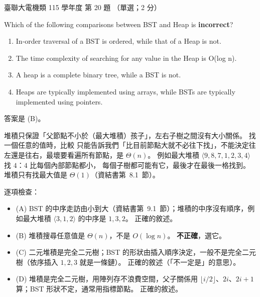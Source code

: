 \begin{pastexam}[label={px:ust-115-ee-ds-20}]{臺聯大電機類 115 學年度 第 20 題}
（單選；2 分）

Which of the following comparisons between BST and Heap is \textbf{incorrect}?
\begin{enumerate}[label=(\Alph*)]
\item In-order traversal of a BST is ordered, while that of a Heap is not.
\item The time complexity of searching for any value in the Heap is O(log n).
\item A heap is a complete binary tree, while a BST is not.
\item Heaps are typically implemented using arrays, while BSTs are typically implemented using
pointers.
\end{enumerate}
\end{pastexam}

\begin{pastsoln}
答案是 (B)。

堆積只保證「父節點不小於（最大堆積）孩子」，左右子樹之間沒有大小關係。 找一個任意的值時，比較
只能告訴我們「比目前節點大就不必往下找」，不能決定往左還是往右，最壞要看遍所有節點，是
$\Theta(n)$。 例如最大堆積 $\langle 9, 8, 7, 1, 2, 3, 4\rangle$ 找 $4$：$4$ 比每個內部節點都小，
每個子樹都可能有它，最後才在最後一格找到。 堆積只有找最大值是 $\Theta(1)$（資結書第~8.1~節）。

逐項檢查：
\begin{itemize}
\item (A) BST 的中序走訪由小到大（資結書第~9.1~節）；堆積的中序沒有順序，例如最大堆積
$\langle 3, 1, 2\rangle$ 的中序是 $1, 3, 2$。 正確的敘述。
\item (B) 堆積搜尋任意值是 $\Theta(n)$，不是 $O(\log n)$。 \textbf{不正確}，選它。
\item (C) 二元堆積是完全二元樹；BST 的形狀由插入順序決定，一般不是完全二元樹（依序插入
$1, 2, 3$ 就是一條鏈）。 正確的敘述（「不一定是」的意思）。
\item (D) 堆積是完全二元樹，用陣列存不浪費空間，父子關係用 $\lfloor i/2 \rfloor$、$2i$、$2i+1$
算；BST 形狀不定，通常用指標節點。 正確的敘述。
\end{itemize}
\end{pastsoln}
